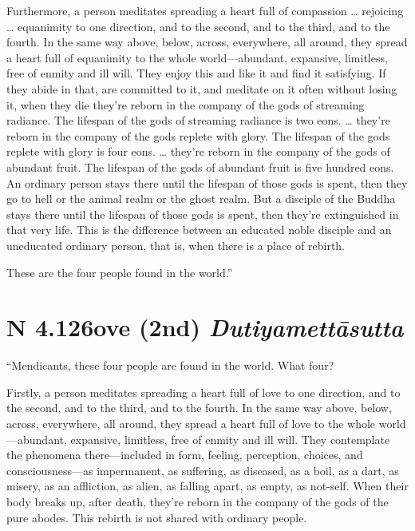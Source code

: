 \documentclass[12pt,openany]{book}%
\newcommand*{\suttatitleacronym}[1]{\smaller[2]{#1}\vspace*{.3em}}
\newcommand*{\suttatitletranslation}[1]{\linebreak{#1}}
\newcommand*{\suttatitleroot}[1]{\linebreak\smaller[2]\itshape{#1}}
\newcommand*{\tocacronym}[1]{\hspace*{-3.3em}{#1}\quad}
\newcommand*{\toctranslation}[1]{#1}
\newcommand*{\tocroot}[1]{(\textit{#1})}
\begin{document}
Furthermore, a person meditates spreading a heart full of compassion … rejoicing … equanimity to one direction, and to the second, and to the third, and to the fourth. In the same way above, below, across, everywhere, all around, they spread a heart full of equanimity to the whole world—abundant, expansive, limitless, free of enmity and ill will. They enjoy this and like it and find it satisfying. If they abide in that, are committed to it, and meditate on it often without losing it, when they die they’re reborn in the company of the gods of streaming radiance. The lifespan of the gods of streaming radiance is two eons. … they’re reborn in the company of the gods replete with glory. The lifespan of the gods replete with glory is four eons. … they’re reborn in the company of the gods of abundant fruit. The lifespan of the gods of abundant fruit is five hundred eons. An ordinary person stays there until the lifespan of those gods is spent, then they go to hell or the animal realm or the ghost realm. But a disciple of the Buddha stays there until the lifespan of those gods is spent, then they’re extinguished in that very life. This is the difference between an educated noble disciple and an uneducated ordinary person, that is, when there is a place of rebirth. 

These are the four people found in the world.” 

%
\section*{{\suttatitleacronym AN 4.126}{\suttatitletranslation Love (2nd) }{\suttatitleroot Dutiyamettāsutta}}
\addcontentsline{toc}{section}{\tocacronym{AN 4.126} \toctranslation{Love (2nd) } \tocroot{Dutiyamettāsutta}}

“Mendicants, these four people are found in the world. What four? 

Firstly, a person meditates spreading a heart full of love to one direction, and to the second, and to the third, and to the fourth. In the same way above, below, across, everywhere, all around, they spread a heart full of love to the whole world—abundant, expansive, limitless, free of enmity and ill will. They contemplate the phenomena there—included in form, feeling, perception, choices, and consciousness—as impermanent, as suffering, as diseased, as a boil, as a dart, as misery, as an affliction, as alien, as falling apart, as empty, as not-self. When their body breaks up, after death, they’re reborn in the company of the gods of the pure abodes. This rebirth is not shared with ordinary people. 
\end{document}
